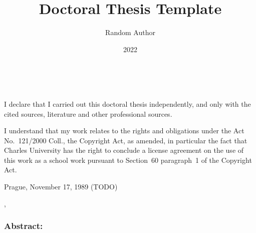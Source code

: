 \documentclass[12pt,notitlepage,a4paper,openright]{report}
\title{Doctoral Thesis Template}
\author{Random Author}
\date{2022}
\begin{document}
%
%
%
\renewcommand{\thepage}{\roman{page}}
\maketitle

\pagestyle{plain}
\normalsize
\setcounter{page}{2}

\cleardoublepage{}
\ \vspace{10mm}

\noindent \it

\vspace{\fill}
\noindent \rm
I declare that I carried out this doctoral thesis independently,
  and only with the cited sources, literature and other professional sources.

I understand that my work relates to the rights and obligations
  under the Act No.~121/2000 Coll., the Copyright Act, as amended,
  in particular the fact that Charles University has the right
  to conclude a license agreement on the use of this work as a school work
  pursuant to Section~60 paragraph~1 of the Copyright Act.

\vspace{2cm}
\noindent Prague, November 17, 1989 (TODO) \hspace{\fill}\theauthor %



\cleardoublepage{} %
\pagestyle{plain}


\begin{description}[leftmargin=7.5em,labelwidth=7em,labelindent=0em,labelsep=0.5em]
\item[Title:] \thetitle{}
\item[Author:] \theauthor{}
\item[Department:] \thedept{}
\item[Supervisor:] \thesupervisor{},\\ \thedept{}
\end{description}
\subsubsection{Abstract:}
\end{document}
